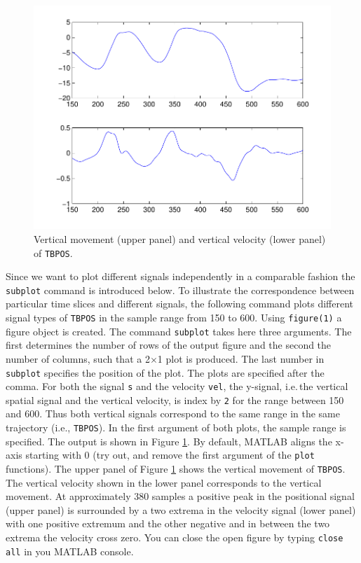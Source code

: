 \documentclass[a4paper, 12pt]{article}
\begin{document}
\setlength\intextsep{-10pt}
\begin{figure}
\includegraphics[scale=0.45]{ysign.pdf}%
\caption{Vertical movement (upper panel) and vertical velocity (lower panel) of \texttt{TBPOS}.}\label{fig:yvel}
\end{figure}

Since we want to plot different signals independently in a comparable fashion the \texttt{subplot} command is introduced below. To illustrate the correspondence between particular time slices and different signals, the following command plots different signal types of \texttt{TBPOS} in the sample range from 150 to 600. Using \texttt{figure(1)} a figure object is created. The command \texttt{subplot} takes here three arguments. The first determines the number of rows of the output figure and the second the number of columns, such that a 2$\times$1 plot is produced. The last number in \texttt{subplot} specifies the position of the plot. The plots are specified after the comma. For both the signal \texttt{s} and the velocity \texttt{vel}, the y-signal, i.e.\,the vertical spatial signal and the vertical velocity, is index by \texttt{2} for the range between 150 and 600. Thus both vertical signals correspond to the same range in the same trajectory (i.e., \texttt{TBPOS}). In the first argument of both plots, the sample range is specified. The output is shown in Figure \ref{fig:yvel}. By default, MATLAB aligns the x-axis starting with 0 (try out, and remove the first argument of the \texttt{plot} functions). The upper panel of Figure \ref{fig:yvel} shows the vertical movement of \texttt{TBPOS}. The vertical velocity shown in the lower panel corresponds to the vertical movement. At approximately 380 samples a positive peak in the positional signal (upper panel) is surrounded by a two extrema in the velocity signal (lower panel) with one positive extremum and the other negative and in between the two extrema the velocity cross zero. You can close the open figure by typing \texttt{close all} in you MATLAB console.\par
\end{document}

